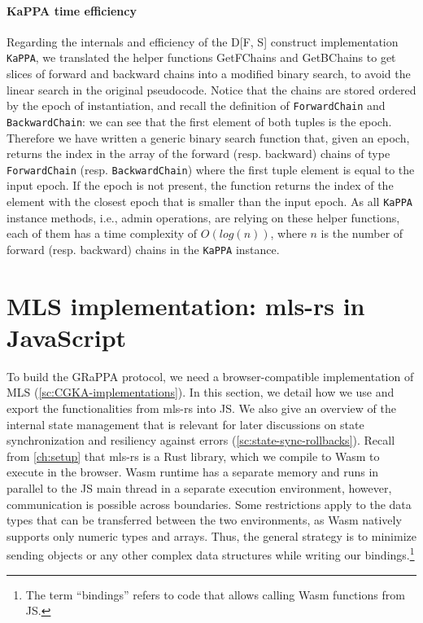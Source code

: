 \paragraph{KaPPA time efficiency}

Regarding the internals and efficiency of the D[F, S] construct
implementation \texttt{KaPPA}, we translated the helper functions 
GetFChains and GetBChains to get
slices of forward and backward chains into a modified binary search,
to avoid the linear search in the original pseudocode.
Notice that the chains are stored ordered by the epoch of instantiation,
and recall the definition of \texttt{ForwardChain} and \texttt{BackwardChain}:
we can see that the first element of both tuples is the epoch.
Therefore we have written a generic binary search function that,
given an epoch, returns the index in the array of the forward (resp. backward)
chains of type \texttt{ForwardChain} (resp. \texttt{BackwardChain})
where the first tuple element is equal to the input epoch. If the epoch is not
present, the function returns the index of the element with the 
closest epoch that is smaller than the input epoch.
As all \texttt{KaPPA} instance methods, i.e., admin operations,
are relying on these helper functions, each of them has a time
complexity of $O(log(n))$, where $n$ is the number of forward (resp. backward)
chains in the \texttt{KaPPA} instance.

\section{MLS implementation: mls-rs in JavaScript}\label{sc:js-bindings-for-mls}

To build the GRaPPA protocol, we need a browser-compatible implementation
of MLS (\cref{sc:CGKA-implementations}).
In this section, we detail how we use and export the functionalities from mls-rs
into JS. We also give an overview of the internal state management
that is relevant for later discussions on state synchronization and resiliency
against errors (\cref{sc:state-sync-rollbacks}).
Recall from \cref{ch:setup} that mls-rs is a Rust library, which we
compile to Wasm to execute in the browser.
Wasm runtime has a separate memory and runs in parallel
to the JS main thread in a separate execution environment, however, communication
is possible across boundaries. Some restrictions apply to the data types
that can be transferred between the two environments, as Wasm natively supports
only numeric types and arrays. Thus, the general strategy 
is to minimize sending objects or any other complex data structures 
while writing our bindings.\footnote{The term ``bindings'' refers to code that allows calling Wasm functions from JS.}

